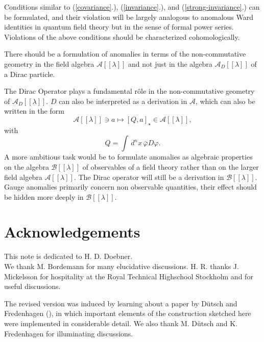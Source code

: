 \documentclass[a4paper,12pt]{article}
\begin{document}
Conditions similar to (\ref{covariance}.), (\ref{invariance}.), and
(\ref{strong-invariance}.) can be formulated, and their violation will be largely 
analogous to anomalous Ward identities in quantum field theory but in the sense 
of formal power series. Violations of the above conditions should be
characterized cohomologically.

There should be a formulation of anomalies in terms of the non-commutative
geometry in the field algebra $\mathcal A[[\lambda]]$ and not just in the
algebra $\mathcal A_D[[\lambda]]$ of a Dirac particle.

The Dirac Operator plays a fundamental r\^ole in the non-commutative geometry of 
$\mathcal A_D[[\lambda]]$. $D$ can also be interpreted as a derivation in
$\mathcal A$, which can also be written in the form 
\[
\mathcal A[[\lambda]]\ni a\mapsto[Q,a]_\star\in\mathcal A[[\lambda]],
\]
with
\[
Q=\int\,d^nx\,\bar\varphi D\varphi.
\]
A more ambitious task would be to formulate anomalies as algebraic properties on 
the algebra $\mathcal B[[\lambda]]$ of observables of a field theory rather than
on the larger field algebra $\mathcal A[[\lambda]]$. The Dirac operator will
still be a derivation in $\mathcal B[[\lambda]]$. Gauge anomalies primarily
concern non observable quantities, their effect should be hidden more deeply in
$\mathcal B[[\lambda]]$. 


\section*{Acknowledgements} 

This note is dedicated to H. D. Doebner.\\
We thank M. Bordemann for many elucidative discussions. H. R. thanks
J. Mickelsson for hospitality at the Royal Technical Highschool Stockholm and
for useful discussions. 

The revised version was induced by learning about a paper by D\"utsch
and Fredenhagen (\cite{DF00}), in which important elements of 
the construction sketched here were
implemented in considerable detail. We also thank M. D\"utsch and 
K. Fredenhagen for
illuminating discussions.
\end{document}
